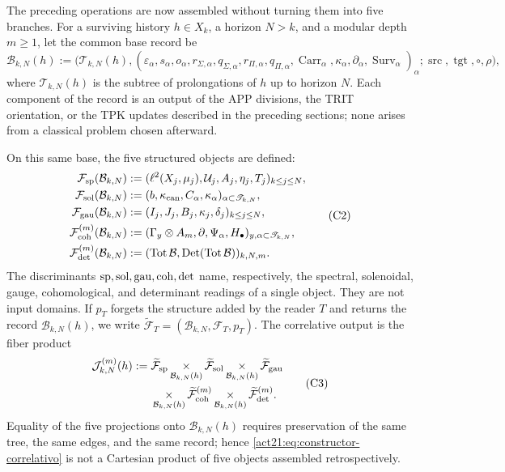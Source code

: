 The preceding operations are now assembled without turning them into five branches.
For a surviving history \(h\in X_k\), a horizon \(N>k\), and a
modular depth \(m\geq1\), let the common base record be
\[
 \mathcal B_{k,N}(h):=
 \bigl(\mathscr T_{k,N}(h),
       (\varepsilon_\alpha,s_\alpha,o_\alpha,
        r_{\Sigma,\alpha},q_{\Sigma,\alpha},
        r_{\Pi,\alpha},q_{\Pi,\alpha},
        \operatorname{Carr}_\alpha,
        \kappa_\alpha,\partial_\alpha,
        \operatorname{Surv}_\alpha)_\alpha;
       \operatorname{src},\operatorname{tgt},\circ,\rho\bigr),
 \tag{C1}
 \label{act21:eq:base-comun-registros}
\]
where \(\mathscr T_{k,N}(h)\) is the subtree of prolongations of \(h\)
up to horizon \(N\). Each component of the record is an output of the
APP divisions, the TRIT orientation, or the TPK updates described
in the preceding sections; none arises from a classical problem chosen
afterward.

On this same base, the five structured objects are defined:
\[
\begin{aligned}
 \mathcal F_{\rm sp}(\mathcal B_{k,N})
   &:=(\ell^2(X_j,\mu_j),\mathcal U_j,A_j,\eta_j,T_j)_{k\leq j\leq N},\\
 \mathcal F_{\rm sol}(\mathcal B_{k,N})
   &:=(b,\kappa_{\rm can},C_\alpha,\kappa_\alpha)_{\alpha\subset\mathscr T_{k,N}},\\
 \mathcal F_{\rm gau}(\mathcal B_{k,N})
   &:=(I_j,J_j,B_j,\kappa_j,\delta_j)_{k\leq j\leq N},\\
 \mathcal F_{\rm coh}^{(m)}(\mathcal B_{k,N})
   &:=(\Gamma_y\otimes A_m,\partial,\Psi_\alpha,H_\bullet)_{y,\alpha\subset\mathscr T_{k,N}},\\
 \mathcal F_{\rm det}^{(m)}(\mathcal B_{k,N})
   &:=(\operatorname{Tot}\mathcal B,\operatorname{Det}(\operatorname{Tot}\mathcal B))_{k,N,m}.
\end{aligned}
 \tag{C2}
\]
The discriminants \({\rm sp},{\rm sol},{\rm gau},{\rm coh},{\rm det}\)
name, respectively, the spectral, solenoidal, gauge,
cohomological, and determinant readings of a single object. They are not input domains.
If \(p_T\) forgets the structure added by the reader \(T\) and returns the
record \(\mathcal B_{k,N}(h)\), we write
\(\widetilde{\mathcal F}_T=(\mathcal B_{k,N},\mathcal F_T,p_T)\). The
correlative output is the fiber product
\[
\begin{aligned}
 \mathcal J_{k,N}^{(m)}(h):={}&
 \widetilde{\mathcal F}_{\rm sp}
 \mathop{\times}_{\mathcal B_{k,N}(h)}
 \widetilde{\mathcal F}_{\rm sol}
 \mathop{\times}_{\mathcal B_{k,N}(h)}
 \widetilde{\mathcal F}_{\rm gau}\\
 &\mathop{\times}_{\mathcal B_{k,N}(h)}
 \widetilde{\mathcal F}_{\rm coh}^{(m)}
 \mathop{\times}_{\mathcal B_{k,N}(h)}
 \widetilde{\mathcal F}_{\rm det}^{(m)}.
\end{aligned}
 \tag{C3}
 \label{act21:eq:constructor-correlativo}
\]
Equality of the five projections onto \(\mathcal B_{k,N}(h)\) requires
preservation of the same tree, the same edges, and the same record; hence
\eqref{act21:eq:constructor-correlativo} is not a Cartesian product of five
objects assembled retrospectively.

